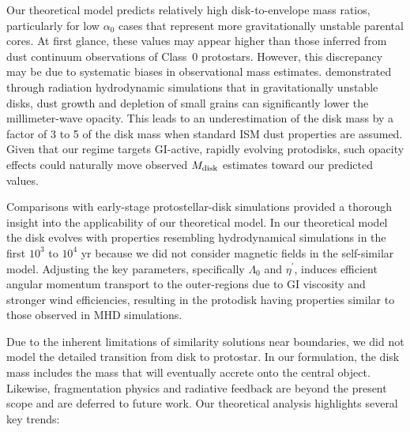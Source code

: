\documentclass[twocolumn,linenumbers]{aastex631}
\begin{document}
Our theoretical model predicts relatively high disk-to-envelope mass ratios, particularly for low $\alpha_0$ cases that represent more gravitationally unstable parental cores. At first glance, these values may appear higher than those inferred from dust continuum observations of Class~0 protostars. However, this discrepancy may be due to systematic biases in observational mass estimates. \citet{tsukamoto2017impact} demonstrated through radiation hydrodynamic simulations that in gravitationally unstable disks, dust growth and depletion of small grains can significantly lower the millimeter-wave opacity. This leads to an underestimation of the disk mass by a factor of 3 to 5 of the disk mass when standard ISM dust properties are assumed. Given that our regime targets GI-active, rapidly evolving protodisks, such opacity effects could naturally move observed $M_{\rm disk}$ estimates toward our predicted values.

Comparisons with early-stage protostellar-disk simulations provided a thorough insight into the applicability of our theoretical model. In our theoretical model the disk evolves with properties resembling hydrodynamical simulations in the first $10^3 $ to $10^4$ yr because we did not consider magnetic fields in the self-similar model. Adjusting the key parameters, specifically $\Lambda_0$ and $\eta^{\prime}$, induces efficient angular momentum transport to the outer-regions due to GI viscosity and stronger wind efficiencies, resulting in the protodisk having properties similar to those observed in MHD simulations.

Due to the inherent limitations of similarity solutions near boundaries, we did not model the detailed transition from disk to protostar. In our formulation, the disk mass includes the mass that will eventually accrete onto the central object. Likewise, fragmentation physics and radiative feedback are beyond the present scope and are deferred to future work.
Our theoretical analysis highlights several key trends:
\end{document}
